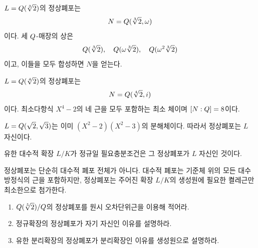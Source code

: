 \begin{example}
$L=Q(\sqrt[3]{2})$의 정상폐포는
\[
  N=Q(\sqrt[3]{2},\omega)
\]
이다. 세 $Q$-매장의 상은
\[
  Q(\sqrt[3]{2}),\quad
  Q(\omega\sqrt[3]{2}),\quad
  Q(\omega^2\sqrt[3]{2})
\]
이고, 이들을 모두 합성하면 $N$을 얻는다.
\end{example}

\begin{example}
$L=Q(\sqrt[4]{2})$의 정상폐포는
\[
  N=Q(\sqrt[4]{2},i)
\]
이다. 최소다항식 $X^4-2$의 네 근을 모두 포함하는 최소 체이며 $[N:Q]=8$이다.
\end{example}

\begin{example}
$L=Q(\sqrt2,\sqrt3)$는 이미 $(X^2-2)(X^2-3)$의 분해체이다. 따라서 정상폐포는 $L$ 자신이다.
\end{example}

\begin{corollary}
유한 대수적 확장 $L/K$가 정규일 필요충분조건은 그 정상폐포가 $L$ 자신인 것이다.
\end{corollary}

\begin{pitfall}
정상폐포는 단순히 대수적 폐포 전체가 아니다. 대수적 폐포는 기준체 위의 모든 대수방정식의 근을 포함하지만, 정상폐포는 주어진 확장 $L/K$의 생성원에 필요한 켤레근만 최소한으로 첨가한다.
\end{pitfall}

\begin{checkpoint}
\begin{enumerate}[label=(\alph*)]
  \item $Q(\sqrt[5]{2})/Q$의 정상폐포를 원시 오차단위근을 이용해 적어라.
  \item 정규확장의 정상폐포가 자기 자신인 이유를 설명하라.
  \item 유한 분리확장의 정상폐포가 분리확장인 이유를 생성원으로 설명하라.
\end{enumerate}
\end{checkpoint}
